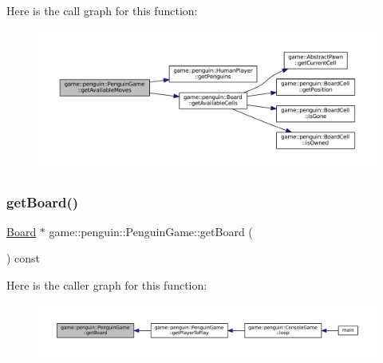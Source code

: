Here is the call graph for this function\+:
\nopagebreak
\begin{figure}[H]
\begin{center}
\leavevmode
\includegraphics[width=350pt]{classgame_1_1penguin_1_1_penguin_game_ae92f96626c8d88f77279b6a76822fbe0_cgraph}
\end{center}
\end{figure}
\mbox{\label{classgame_1_1penguin_1_1_penguin_game_a7b65d0a9742a9cf07296839373a56143}} 
\subsubsection{\texorpdfstring{get\+Board()}{getBoard()}}
{\footnotesize\ttfamily \hyperlink{classgame_1_1penguin_1_1_board}{Board} $\ast$ game\+::penguin\+::\+Penguin\+Game\+::get\+Board (\begin{DoxyParamCaption}{ }\end{DoxyParamCaption}) const}

Here is the caller graph for this function\+:
\nopagebreak
\begin{figure}[H]
\begin{center}
\leavevmode
\includegraphics[width=350pt]{classgame_1_1penguin_1_1_penguin_game_a7b65d0a9742a9cf07296839373a56143_icgraph}
\end{center}
\end{figure}
\mbox{\label{classgame_1_1penguin_1_1_penguin_game_a445296f56e5a823ce9b9e44610734d70}} 
